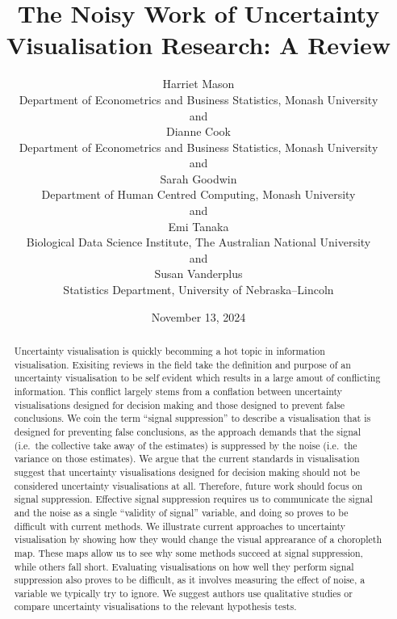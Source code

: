 \documentclass[
  12pt]{article}
\begin{document}
\def\spacingset#1{\renewcommand{\baselinestretch}%
{#1}\small\normalsize} \spacingset{1}



\date{November 13, 2024}
\title{\bf The Noisy Work of Uncertainty Visualisation Research: A
Review}
\author{
Harriet Mason\\
Department of Econometrics and Business Statistics, Monash University\\
and\\Dianne Cook\\
Department of Econometrics and Business Statistics, Monash University\\
and\\Sarah Goodwin\\
Department of Human Centred Computing, Monash University\\
and\\Emi Tanaka\\
Biological Data Science Institute, The Australian National University\\
and\\Susan Vanderplus\\
Statistics Department, University of Nebraska--Lincoln\\
}
\maketitle

\bigskip
\bigskip
\begin{abstract}
Uncertainty visualisation is quickly becomming a hot topic in
information visualisation. Exisiting reviews in the field take the
definition and purpose of an uncertainty visualisation to be self
evident which results in a large amout of conflicting information. This
conflict largely stems from a conflation between uncertainty
visualisations designed for decision making and those designed to
prevent false conclusions. We coin the term ``signal suppression'' to
describe a visualisation that is designed for preventing false
conclusions, as the approach demands that the signal (i.e.~the
collective take away of the estimates) is suppressed by the noise
(i.e.~the variance on those estimates). We argue that the current
standards in visualisation suggest that uncertainty visualisations
designed for decision making should not be considered uncertainty
visualisations at all. Therefore, future work should focus on signal
suppression. Effective signal suppression requires us to communicate the
signal and the noise as a single ``validity of signal'' variable, and
doing so proves to be difficult with current methods. We illustrate
current approaches to uncertainty visualisation by showing how they
would change the visual apprearance of a choropleth map. These maps
allow us to see why some methods succeed at signal suppression, while
others fall short. Evaluating visualisations on how well they perform
signal suppression also proves to be difficult, as it involves measuring
the effect of noise, a variable we typically try to ignore. We suggest
authors use qualitative studies or compare uncertainty visualisations to
the relevant hypothesis tests.
\end{abstract}
\end{document}
